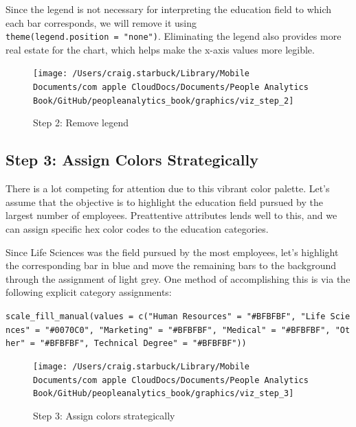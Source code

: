 \documentclass[
]{book}
\begin{document}
Since the legend is not necessary for interpreting the education field to which each bar corresponds, we will remove it using \texttt{theme(legend.position\ =\ "none")}. Eliminating the legend also provides more real estate for the chart, which helps make the x-axis values more legible.

\begin{figure}

{\centering \texttt{[image: /Users/craig.starbuck/Library/Mobile Documents/com~apple~CloudDocs/Documents/People Analytics Book/GitHub/peopleanalytics\_book/graphics/viz\_step\_2]} 

}

\caption{Step 2: Remove legend}\label{fig:barchart-2}
\end{figure}

\hypertarget{step-3-assign-colors-strategically}{%
\subsection{Step 3: Assign Colors Strategically}\label{step-3-assign-colors-strategically}}

There is a lot competing for attention due to this vibrant color palette. Let's assume that the objective is to highlight the education field pursued by the largest number of employees. Preattentive attributes lends well to this, and we can assign specific hex color codes to the education categories.

Since Life Sciences was the field pursued by the most employees, let's highlight the corresponding bar in blue and move the remaining bars to the background through the assignment of light grey. One method of accomplishing this is via the following explicit category assignments:

\texttt{scale\_fill\_manual(values\ =\ c("Human\ Resources"\ =\ "\#BFBFBF",\ "Life\ Sciences"\ =\ "\#0070C0",\ "Marketing"\ =\ "\#BFBFBF",\ "Medical"\ =\ "\#BFBFBF",\ "Other"\ =\ "\#BFBFBF",\ Technical\ Degree"\ =\ "\#BFBFBF"))}

\begin{figure}

{\centering \texttt{[image: /Users/craig.starbuck/Library/Mobile Documents/com~apple~CloudDocs/Documents/People Analytics Book/GitHub/peopleanalytics\_book/graphics/viz\_step\_3]} 

}

\caption{Step 3: Assign colors strategically}\label{fig:barchart-3}
\end{figure}
\end{document}
